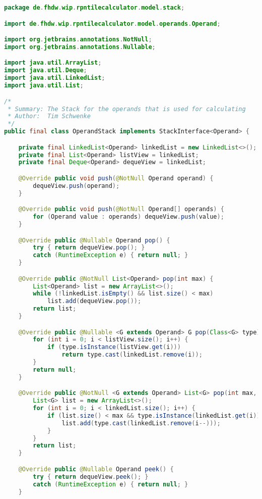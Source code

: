 \begin{lstlisting}[caption=OperandStack (Schwenke),label=list:OperandStack,language=Java]
package de.fhdw.wip.rpntilecalculator.model.stack;

import de.fhdw.wip.rpntilecalculator.model.operands.Operand;

import org.jetbrains.annotations.NotNull;
import org.jetbrains.annotations.Nullable;

import java.util.ArrayList;
import java.util.Deque;
import java.util.LinkedList;
import java.util.List;

/*
 * Summary: The Stack for the operands that is used for calculating
 * Author:  Tim Schwenke
 */
public final class OperandStack implements StackInterface<Operand> {

    private final LinkedList<Operand> linkedList = new LinkedList<>();
    private final List<Operand> listView = linkedList;
    private final Deque<Operand> dequeView = linkedList;

    @Override public void push(@NotNull Operand operand) {
        dequeView.push(operand);
    }

    @Override public void push(@NotNull Operand[] operands) {
        for (Operand value : operands) dequeView.push(value);
    }

    @Override public @Nullable Operand pop() {
        try { return dequeView.pop(); }
        catch (RuntimeException e) { return null; }
    }

    @Override public @NotNull List<Operand> pop(int max) {
        List<Operand> list = new ArrayList<>();
        while (!linkedList.isEmpty() && list.size() < max)
            list.add(dequeView.pop());
        return list;
    }

    @Override public @Nullable <G extends Operand> G pop(Class<G> type) {
        for (int i = 0; i < listView.size(); i++) {
            if (type.isInstance(listView.get(i)))
                return type.cast(linkedList.remove(i));
        }
        return null;
    }

    @Override public @NotNull <G extends Operand> List<G> pop(int max, Class<G> type) {
        List<G> list = new ArrayList<>();
        for (int i = 0; i < linkedList.size(); i++) {
            if (list.size() < max && type.isInstance(linkedList.get(i))) {
                list.add(type.cast(linkedList.remove(i--)));
            }
        }
        return list;
    }

    @Override public @Nullable Operand peek() {
        try { return dequeView.peek(); }
        catch (RuntimeException e) { return null; }
    }


\end{lstlisting}
